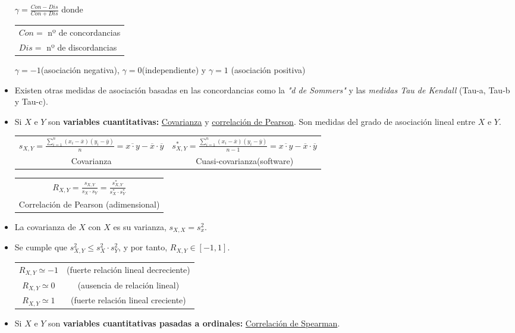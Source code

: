\begin{itemize}
	$\gamma = \displaystyle \frac{Con - Dis}{Con + Dis}$ donde \begin{tabular}{l}$Con=$ nº de concordancias\\ $Dis=$ nº de discordancias\end{tabular}
	
	$\gamma=-1$(asociación negativa), $\gamma=0$(independiente) y $\gamma=1$ (asociación positiva)
	\item Existen otras medidas de asociación basadas en las concordancias como la \textit{"d de Sommers"} y las \textit{medidas Tau de Kendall} (Tau-a, Tau-b y Tau-c).
	\item Si $X$ e $Y$ son \textbf{variables cuantitativas:} \underline{Covarianza} y \underline{correlación de Pearson}. Son medidas del grado de asociación lineal entre $X$ e $Y$. \begin{center}\begin{tabular}{cc}$s_{X,Y}=\frac{\displaystyle \sum_{i=1}^{n}{(x_{i}-\overline{x})(y_{i}-\overline{y})}}{n}=\overline{x \cdot y}-\overline{x}\cdot \overline{y}$ & $s_{X,Y}^{*}=\frac{\displaystyle \sum_{i=1}^{n}{(x_{i}-\overline{x})(y_{i}-\overline{y})}}{n-1}=\overline{x \cdot y}-\overline{x}\cdot \overline{y}$\\ Covarianza & Cuasi-covarianza(software)\end{tabular}\end{center} \begin{center}\begin{tabular}{c}$R_{X,Y}=\displaystyle \frac{s_{X,Y}}{s_{X}\cdot s_{Y}}=\displaystyle \frac{s_{X,Y}^{*}}{s_{X}^{*}\cdot s_{Y}^{*}}$\\Correlación de Pearson (adimensional)\end{tabular}\end{center}
	\item La covarianza de $X$ con $X$ es su varianza, $s_{X,X}=s_{x}^2$.
	\item Se cumple que $s_{X,Y}^{2}\le s_{X}^{2} \cdot s_{Y}^{2}$, y por tanto, $R_{X,Y}\in [-1, 1]$. \begin{center}\begin{tabular}{cc}$R_{X,Y}\simeq -1$ & (fuerte relación lineal decreciente)\\$R_{X,Y}\simeq 0$ & (ausencia de relación lineal)\\$R_{X,Y}\simeq 1$ & (fuerte relación lineal creciente)\end{tabular}\end{center}
	\item Si $X$ e $Y$ son \textbf{variables cuantitativas pasadas a ordinales:} \underline{Correlación de Spearman}.

\end{itemize}
